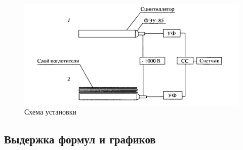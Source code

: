 \documentclass[a4paper,12pt]{article}
\theoremstyle{plain} %
\theoremstyle{definition} %
\theoremstyle{remark} %
\begin{document}
\begin{figure}[h]
        \includegraphics[width=0.7 \textwidth]{Materials/ust.png}
    \caption{Схема установки}
\end{figure}

\newpage
\subsection{Выдержка формул и графиков}

\begin{minipage}{0.45\textwidth}
\end{minipage}
\hfill
\begin{minipage}{0.45\textwidth}
\end{minipage}
\end{document}
